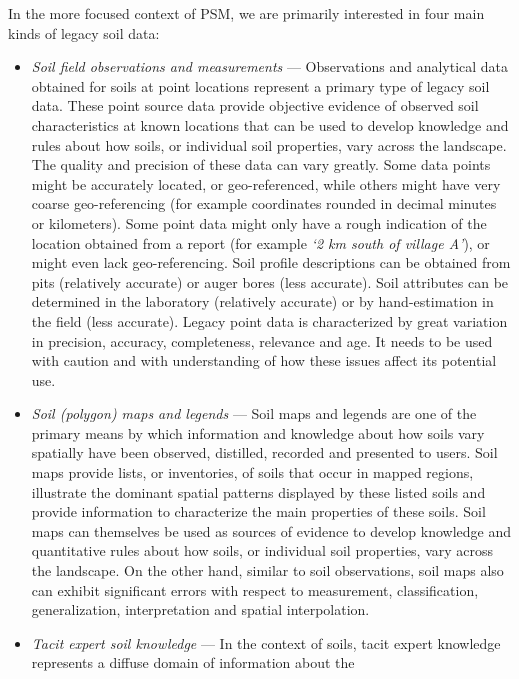 \documentclass[11pt]{krantz}
\theoremstyle{definition}
\theoremstyle{definition}
\theoremstyle{definition}
\theoremstyle{remark}
\begin{document}
In the more focused context of PSM, we are primarily interested in four
main kinds of legacy soil data:

\begin{itemize}
\item
  \emph{Soil field observations and measurements} --- Observations and
  analytical data obtained for soils at point locations represent a
  primary type of legacy soil data. These point source data provide
  objective evidence of observed soil characteristics at known locations
  that can be used to develop knowledge and rules about how soils, or
  individual soil properties, vary across the landscape. The quality and
  precision of these data can vary greatly. Some data points might be
  accurately located, or geo-referenced, while others might have very
  coarse geo-referencing (for example coordinates rounded in decimal
  minutes or kilometers). Some point data might only have a rough
  indication of the location obtained from a report (for example
  \emph{`2 km south of village A'}), or might even lack geo-referencing.
  Soil profile descriptions can be obtained from pits (relatively
  accurate) or auger bores (less accurate). Soil attributes can be
  determined in the laboratory (relatively accurate) or by
  hand-estimation in the field (less accurate). Legacy point data is
  characterized by great variation in precision, accuracy, completeness,
  relevance and age. It needs to be used with caution and with
  understanding of how these issues affect its potential use.
\item
  \emph{Soil (polygon) maps and legends} --- Soil maps and legends are
  one of the primary means by which information and knowledge about how
  soils vary spatially have been observed, distilled, recorded and
  presented to users. Soil maps provide lists, or inventories, of soils
  that occur in mapped regions, illustrate the dominant spatial patterns
  displayed by these listed soils and provide information to
  characterize the main properties of these soils. Soil maps can
  themselves be used as sources of evidence to develop knowledge and
  quantitative rules about how soils, or individual soil properties,
  vary across the landscape. On the other hand, similar to soil
  observations, soil maps also can exhibit significant errors with
  respect to measurement, classification, generalization, interpretation
  and spatial interpolation.
\item
  \emph{Tacit expert soil knowledge} --- In the context of soils, tacit
  expert knowledge represents a diffuse domain of information about the

\end{itemize}
\end{document}
